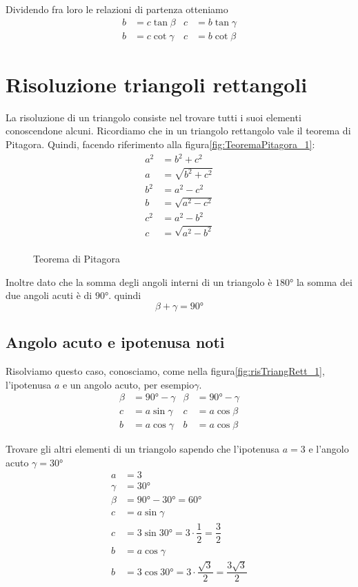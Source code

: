 Dividendo fra loro le relazioni di partenza otteniamo
\begin{align*}
b&=c\tan\beta&c&=b\tan\gamma\\
b&=c\cot\gamma&c&=b\cot\beta
\end{align*}
\section{Risoluzione triangoli rettangoli}
La risoluzione di un triangolo consiste nel trovare tutti i suoi elementi conoscendone alcuni. Ricordiamo che in un triangolo rettangolo vale il teorema di Pitagora. Quindi, facendo riferimento alla figura\nobs\vref{fig:TeoremaPitagora_1}:
\begin{align*}
a^2&=b^2+c^2\\
a{}&=\sqrt{b^2+c^2}\\
b^2&=a^2-c^2\\
b{}&=\sqrt{a^2-c^2}\\
c^2&=a^2-b^2\\
c{}&=\sqrt{a^2-b^2}\\
\end{align*}
\begin{figure}
	\centering
	
	\caption{Teorema di Pitagora}
	\label{fig:TeoremaPitagora_1}
\end{figure}
Inoltre dato che la somma degli angoli interni di un triangolo è 
$\ang{180}$ la somma dei due angoli acuti è di $\ang{90}$. quindi
\[\beta+\gamma=\ang{90}\]
\subsection{Angolo acuto e ipotenusa noti}
Risolviamo questo caso, conosciamo, come nella figura\nobs\vref*{fig:risTriangRett_1}, l'ipotenusa $a$ e un angolo acuto, per esempio\nobs$\gamma$.
\begin{align*}
\beta&=\ang{90}-\gamma&\beta&=\ang{90}-\gamma\\
c&=a\sin\gamma&c&=a\cos\beta\\
b&=a\cos\gamma&b&=a\cos\beta
\end{align*}
\begin{esempio}
Trovare gli altri elementi di un triangolo sapendo che l'ipotenusa $a=3$ e l'angolo acuto $\gamma=\ang{30}$ 
\begin{align*}
a&=3\\
\gamma&=\ang{30}\\
\beta&=\ang{90}-\ang{30}=\ang{60}\\
c&=a\sin\gamma\\
c&=3\sin\ang{30}=3\cdot\dfrac{1}{2}=\dfrac{3}{2}\\
b&=a\cos\gamma\\
b&=3\cos\ang{30}=3\cdot\dfrac{\sqrt{3}}{2}=\dfrac{3\sqrt{3}}{2}
\end{align*}
\end{esempio}
